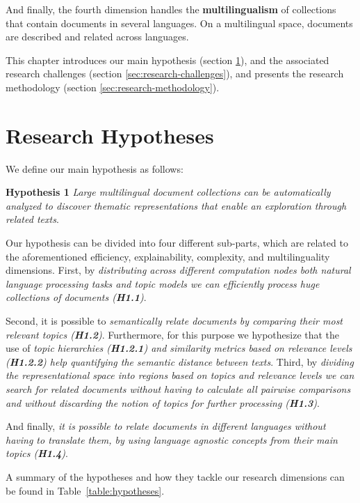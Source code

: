 And finally, the fourth dimension handles the \textbf{multilingualism} of collections that contain documents in several languages. On a multilingual space, documents are described and related across languages.

This chapter introduces our main hypothesis (section \ref{sec:research-hypothesis}), and the associated research challenges (section \ref{sec:research-challenges}), and presents the research methodology (section \ref{sec:research-methodology}).

\section{Research Hypotheses}\label{sec:research-hypothesis}

We define our main hypothesis as follows:

\textbf{Hypothesis 1} \textit{Large multilingual document collections can be automatically analyzed to discover thematic representations that enable an exploration through related texts}.

Our hypothesis can be divided into four different sub-parts, which are related to the aforementioned efficiency, explainability, complexity, and multilinguality dimensions. First, by \textit{distributing across different computation nodes both natural language processing tasks and topic models we can efficiently process huge collections of documents (\textbf{H1.1})}.

Second, it is possible to \textit{semantically relate documents by comparing their most relevant topics (\textbf{H1.2})}. Furthermore, for this purpose we hypothesize that the use of \textit{topic hierarchies (\textbf{H1.2.1}) and similarity metrics based on relevance levels (\textbf{H1.2.2}) help quantifying the semantic distance between texts}. Third, by \textit{dividing the representational space into regions based on topics and relevance levels we can search for related documents without having to calculate all pairwise comparisons and without discarding the notion of topics for further processing (\textbf{H1.3})}.

And finally, \textit{it is possible to relate documents in different languages without having to translate them, by using language agnostic concepts from their main topics (\textbf{H1.4})}.

A summary of the hypotheses and how they tackle our research dimensions can be found in Table~\ref{table:hypotheses}.

